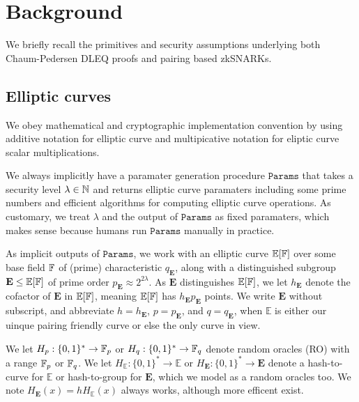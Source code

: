 
\section{Background}
\label{sec:background}

\def\secparam{\ensuremath{\lambda}\xspace}

\def\ecE{{\mathbb{E}}}
\def\grE{{\mathbf{E}}}
\def\genE{E}
\def\genG{G}
\def\genB{K} %

\def\ecJ{{\mathbb{J}}}
\def\grJ{{\mathbf{J}}}
\def\genJ{J}

We briefly recall the primitives and security assumptions underlying
both Chaum-Pedersen DLEQ proofs and pairing based zkSNARKs. 


\subsection{Elliptic curves}

We obey mathematical and cryptographic implementation convention by using additive notation for elliptic curve and multipicative notation for eliptic curve scalar multiplications. 

We always implicitly have a paramater generation procedure $\mathtt{Params}$ that takes a security level $\secparam \in \N$ and returns elliptic curve paramaters including some prime numbers and efficient algorithms for computing elliptic curve operations.  As customary, we treat $\secparam$ and the output of $\mathtt{Params}$ as fixed paramaters, which makes sense because humans run $\mathtt{Params}$ manually in practice. 

As implicit outputs of $\mathtt{Params}$, we work with an elliptic curve $\ecE[\F]$ over some base field $\mathbb{F}$ of (prime) characteristic $q_{\grE}$, along with a distinguished subgroup $\grE \le \ecE[\F]$ of prime order $p_{\grE} \approx 2^{2\secparam}$.  As $\grE$ distinguishes $\ecE[\F]$, we let $h_{\grE}$ denote the cofactor of $\grE$ in $\ecE[\F]$, meaning $\ecE[\F]$ has $h_{\grE} p_{\grE}$ points.
We write $\grE$ without subscript, and abbreviate $h = h_{\grE}$, $p = p_{\grE}$, and $q = q_{\grE}$, when $\ecE$ is either our uinque pairing friendly curve or else the only curve in view.

We let $H_p : \{0,1\}^* \to \mathbb{F}_p$ or $H_q : \{0,1\}^* \to \mathbb{F}_q$ denote random oracles (RO) with a range $\mathbb{F}_p$ or $\mathbb{F}_q$.  We let $H_\ecE : \{0,1\}^* \to \ecE$ or $H_\grE : \{0,1\}^* \to \grE$ denote a hash-to-curve for $\ecE$ or hash-to-group for $\grE$, which we model as a random oracles too.  We note $H_\grE(x) = h H_\ecE(x)$ always works, although more efficent exist.

